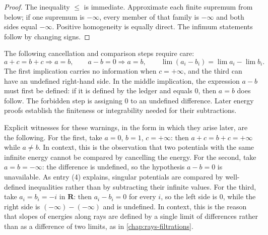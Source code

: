 \begin{proof}
The inequality $\leq$ is immediate.  Approximate each finite supremum from
below; if one supremum is $-\infty$, every member of that family is
$-\infty$ and both sides equal $-\infty$.  Positive homogeneity is equally
direct.  The infimum statements follow by changing signs.
\end{proof}

\begin{remark}
\label{rem:forbidden-cancellations}
The following cancellation and comparison steps require care:
\[
 a+c=b+c\Longrightarrow a=b,
 \qquad
 a-b=0\Longrightarrow a=b,
 \qquad
 \lim(a_i-b_i)=\lim a_i-\lim b_i.
\]
The first implication carries no information when $c=+\infty$, and the
third can have an undefined right-hand side.  In the middle implication,
the expression $a-b$ must first be defined: if it is defined by the ledger
and equals $0$, then $a=b$ does follow.  The forbidden step is assigning
$0$ to an undefined difference.  Later energy proofs establish the
finiteness or integrability needed for their subtractions.
\end{remark}

Explicit witnesses for these warnings, in the form in which they arise
later, are the following.  For the first, take $a=0$, $b=1$, $c=+\infty$: then
$a+c=b+c=+\infty$ while $a\neq b$.  In context, this is the observation that
two potentials with the same infinite energy cannot be compared by cancelling
the energy.  For the second, take $a=b=-\infty$: the difference is undefined,
so the hypothesis $a-b=0$ is unavailable.  As entry (4) explains, singular
potentials are compared by well-defined inequalities rather than by
subtracting their infinite values.  For the third, take $a_i=b_i=-i$ in $\mathbf R$:
then $a_i-b_i=0$ for every $i$, so the left side is $0$, while the right side
is $(-\infty)-(-\infty)$ and is undefined.  In context, this is the reason
that slopes of energies along rays are defined by a single limit of
differences rather than as a difference of two limits, as in
\cref{chap:rays-filtrations}.

